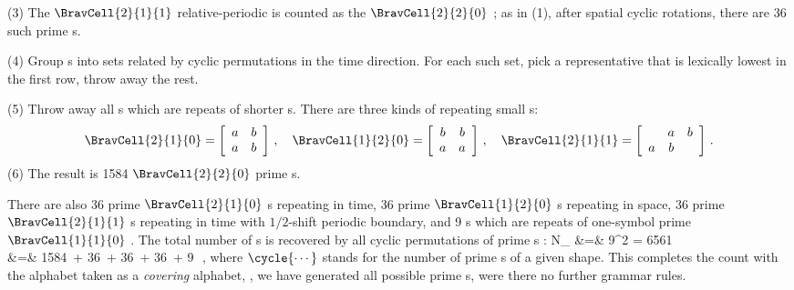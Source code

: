 (3) The $\BravCell{2}{1}{1}$ relative-periodic {\brick}  is
counted as the $\BravCell{2}{2}{0}$ \twot; as in (1), after spatial cyclic
rotations, there are 36 such prime {\brick}s.

(4) Group \brick s into sets related by cyclic permutations in the time
direction. For each such set, pick a representative that is lexically
lowest in the first row, throw away the rest.

(5) Throw away all {\brick}s which are repeats of
shorter {\brick}s. There are three kinds of repeating small {\brick}s:
\[
\BravCell{2}{1}{0}=\left[\begin{array}{cc}
a & b \\
a & b \\
              \end{array}\right]
\, , \quad
\BravCell{1}{2}{0}=\left[\begin{array}{cc}
b & b \\
a & a \\
              \end{array}\right]
\, , \quad
\BravCell{2}{1}{1}=\left[\begin{array}{ccc}
  & a & b \\
a & b &   \\
              \end{array}\right]
\,.
\]
(6)
The result is 1584 $\BravCell{2}{2}{0}$ prime {\brick}s.

There are also 36 prime $\BravCell{2}{1}{0}$ {\brick}s repeating in time, 36
prime $\BravCell{1}{2}{0}$ {\brick}s repeating in space, 36 prime $\BravCell{2}{1}{1}$
{\brick}s repeating in time with $1/2$-shift periodic boundary, and 9
{\brick}s which are repeats of one-symbol prime $\BravCell{1}{1}{0}$ {\brick}.
The total number
of  %
\brick s is recovered by all cyclic permutations of prime \brick s :
\bea
N_{} &=& 9^{2} = 6561
    \label{catlattN2x2}\\
    &=&        {1584}\,
             + {36}\,
             + {36}\,
             + {36}\,
             + {9}\,
\,,
\nnu
\eea
where $\cycle{\cdots}$ stands for the number of prime {\brick}s
of a given shape.
This completes the count with the alphabet
 taken as a {\em covering} alphabet, \ie, we
have generated all possible prime \brick s, were there no further grammar
rules.

